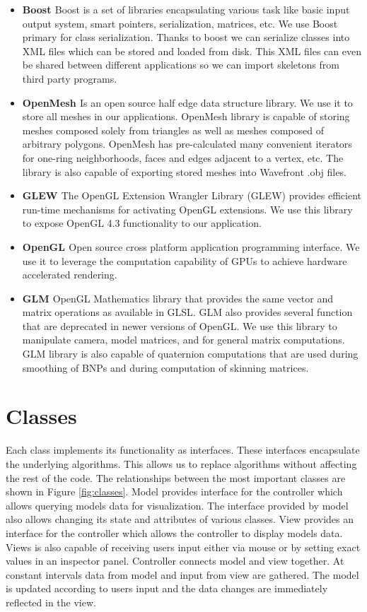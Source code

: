 \begin{itemize}
	\item \textbf{Boost \cite{Boost}} Boost is a set of libraries encapsulating various task like basic input output system, smart pointers, serialization, matrices, etc. We use Boost primary for class serialization. Thanks to boost we can serialize classes into XML files which can be stored and loaded from disk. This XML files can even be shared between different applications so we can import skeletons from third party programs.
	\item \textbf{OpenMesh \cite{OpenMesh}} Is an open source half edge data structure library. We use it to store all meshes in our applications. OpenMesh library is capable of storing meshes composed solely from triangles as well as meshes composed of arbitrary polygons. OpenMesh has pre-calculated many convenient iterators for one-ring neighborhoods, faces and edges adjacent to a vertex, etc. The library is also capable of exporting stored meshes into Wavefront .obj files.
	\item \textbf{GLEW \cite{glew}} The OpenGL Extension Wrangler Library (GLEW) provides efficient run-time mechanisms for activating OpenGL extensions. We use this library to expose OpenGL 4.3 functionality to our application.
	\item \textbf{OpenGL \cite{opengl}} Open source cross platform application programming interface. We use it to leverage the computation capability of GPUs to achieve hardware accelerated rendering.
	\item \textbf{GLM \cite{glm}} OpenGL Mathematics library that provides the same vector and matrix operations as available in GLSL. GLM also provides several function that are deprecated in newer versions of OpenGL. We use this library to manipulate camera, model matrices, and for general matrix computations. GLM library is also capable of quaternion computations that are used during smoothing of BNPs and during computation of skinning matrices.
\end{itemize}

\pagebreak

\section{Classes}

Each class implements its functionality as interfaces.
These interfaces encapsulate the underlying algorithms.
This allows us to replace algorithms without affecting the rest of the code.
The relationships between the most important classes are shown in Figure \ref{fig:classes}.
Model provides interface for the controller which allows querying models data for visualization.
The interface provided by model also allows changing its state and attributes of various classes.
View provides an interface for the controller which allows the controller to display models data.
Views is also capable of receiving users input either via mouse or by setting exact values in an inspector panel.
Controller connects model and view together.
At constant intervals data from model and input from view are gathered.
The model is updated according to users input and the data changes are immediately reflected in the view.

